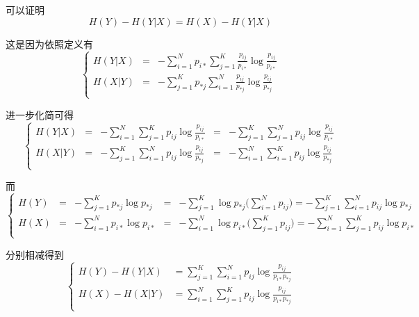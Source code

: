 \begin{remark}
    可以证明
    \begin{equation*}
        H(Y) - H(Y|X) = H(X) - H(Y|X)
    \end{equation*}

    这是因为依照定义有
    \begin{equation*}
        \left\{
        \begin{array}{rcl}
            H(Y|X) & = & -\sum_{i=1}^Np_{i*}\sum_{j=1}^K\frac{p_{ij}}{p_{i*}}\log\frac{p_{ij}}{p_{i*}} \\
            H(X|Y) & = & -\sum_{j=1}^Kp_{*j}\sum_{i=1}^N\frac{p_{ij}}{p_{*j}}\log\frac{p_{ij}}{p_{*j}} \\
        \end{array}
        \right.
    \end{equation*}

    进一步化简可得
    \begin{equation*}
        \left\{
        \begin{array}{rclcl}
            H(Y|X) & = & -\sum_{i=1}^N\sum_{j=1}^Kp_{ij}\log\frac{p_{ij}}{p_{i*}} & = & -\sum_{j=1}^K\sum_{j=1}^Np_{ij}\log\frac{p_{ij}}{p_{i*}} \\
            H(X|Y) & = & -\sum_{j=1}^K\sum_{i=1}^Np_{ij}\log\frac{p_{ij}}{p_{*j}} & = & -\sum_{i=1}^N\sum_{i=1}^Kp_{ij}\log\frac{p_{ij}}{p_{*j}} \\
        \end{array}
        \right.
    \end{equation*}

    而
    \begin{equation*}
        \left\{
        \begin{array}{rclcl}
            H(Y) & = & -\sum_{j=1}^Kp_{*j}\log p_{*j} & = & -\sum_{j=1}^K\log p_{*j}\big(\sum_{i=1}^N p_{ij}\big) = -\sum_{j=1}^K\sum_{i=1}^N p_{ij}\log p_{*j}\\
            H(X) & = & -\sum_{i=1}^Np_{i*}\log p_{i*} & = & -\sum_{i=1}^N\log p_{i*}\big(\sum_{j=1}^K p_{ij}\big) = -\sum_{i=1}^N\sum_{j=1}^K p_{ij}\log p_{i*}\\
        \end{array}
        \right.
    \end{equation*}

    分别相减得到
    \begin{equation*}
        \left\{
        \begin{array}{rclcl}
            H(Y) - H(Y|X) & = \sum_{j=1}^K\sum_{i=1}^N p_{ij}\log \frac{p_{ij}}{p_{i*}p_{*j}}\\
            H(X) - H(X|Y) & = \sum_{i=1}^N\sum_{j=1}^K p_{ij}\log \frac{p_{ij}}{p_{i*}p_{*j}}\\
        \end{array}
        \right.
    \end{equation*}


\end{remark}
